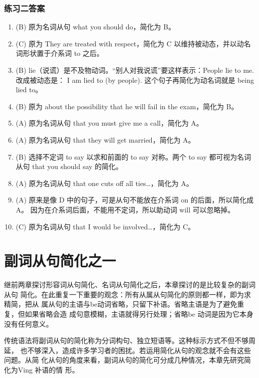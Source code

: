 \subsection{练习二答案}
\begin{enumerate}
\item (B) 原为名词从句 what you should do，简化为 B。

\item (C) 原为 They are treated with respect，简化为 C 以维持被动态，并以动名词形状置于介系词 to 之后。
\item (B) lie（说谎）是不及物动词。“别人对我说谎”要这样表示：People lie to me. 改成被动态是： I am lied to (by people). 这个句子再简化为动名词就是 being lied to。

\item (B) 原为 about the possibility that he will fail in the exam，简化为 B。

\item (A) 原为名词从句 that you must give me a call，简化为 A。

\item (A) 原为名词从句 that they will get married，简化为 A。

\item (B) 选择不定词 to say 以求和前面的 to say 对称。两个 to say 都可视为名词从句 that you should say 的简化。

\item (A) 原为名词从句 that one cuts off all ties…，简化为 A。

\item (A) 原来是像 D 中的句子，可是从句不能放在介系词 on 的后面，所以简化成 A。
  因为在介系词后面，不能用不定词，所以助动词 will 可以忽略掉。

\item (C) 原为名词从句 that I would be involved…，简化为 C。
\end{enumerate}

\chapter{副词从句简化之一}

继前两章探讨形容词从句简化、名词从句简化之后，本章探讨的是比较复杂的副词从句
简化。在此重复一下重要的观念：所有从属从句简化的原则都一样，即为求精简，把从
属从句的主语与be动词省略，只留下补语。省略主语是为了避免重复，但如果省略会造
成句意模糊，主语就得另行处理；省略be 动词是因为它本身没有任何意义。

传统语法将副词从句的简化称为分词构句、独立短语等。这种标示方式不但不够周延，
也不够深入，造成许多学习者的困扰。若运用简化从句的观念就不会有这些问题。从简
化从句的角度来看，副词从句的简化可分成几种情况，本章先研究简化为Ving 补语的情
形。

